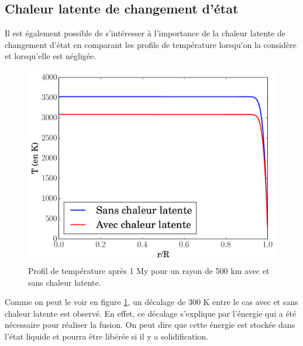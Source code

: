 \documentclass[10pt,a4paper]{article}
\numberwithin{equation}{section}
\begin{document}
\newpage
\subsection{Chaleur latente de changement d'état}
\label{latente}

Il est également possible de s'intéresser à l'importance de la chaleur latente de changement d'état en comparant les profils de température lorsqu'on la considère et lorsqu'elle est négligée.

\begin{figure}[h]
    \centering	    
	\includegraphics[scale=0.43]{figures/diffusion1.pdf}
    \caption{Profil de température après 1 My pour un rayon de 500 km avec et sans chaleur latente.}
    	\label{diffusion1} 
\end{figure}
\medskip

Comme on peut le voir en figure \ref{diffusion1}, un décalage de 300 K entre le cas avec et sans chaleur latente est observé. En effet, ce décalage s'explique par l'énergie qui a été nécessaire pour réaliser la fusion. On peut dire que cette énergie est stockée dans l'état liquide et pourra être libérée si il y a solidification.
\end{document}
